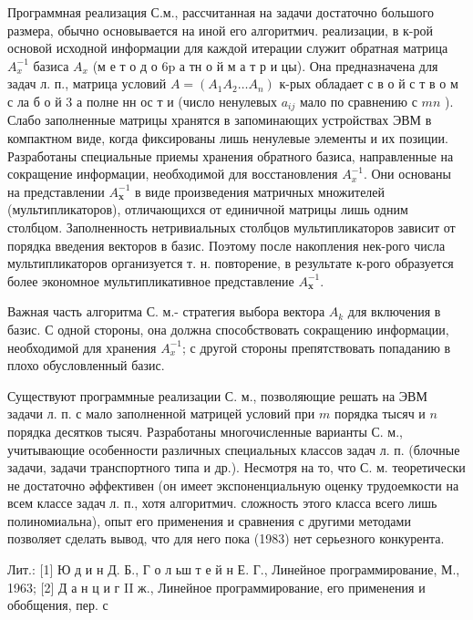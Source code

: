 \documentclass[10pt]{article}
\begin{document}
Программная реализация С.м., рассчитанная на задачи достаточно большого размера, обычно основывается на иной его алгоритмич. реализации, в к-рой основой исходной информации для каждой итерации служит обратная матрица $A_{x}^{-1}$ базиса $A_{x}$ (м е т о д о $6 \mathrm{p}$ а тн о й м а т р и цы). Она предназначена для задач л. п., матрица условий $A=\left(A_{1} A_{2} \ldots A_{n}\right)$ к-рых обладает с в о й с т в о м с ла б о й 3 а полне нн ос т и (число ненулевых $a_{i j}$ мало по сравнению с $m n$ ). Слабо заполненные матрицы хранятся в запоминающих устройствах ЭВМ в компактном виде, когда фиксированы лишь ненулевые элементы и их позиции. Разработаны специальные приемы хранения обратного базиса, направленные на сокращение информации, необходимой для восстановления $A_{x}^{-1}$. Они основаны на представлении $A_{\boldsymbol{x}}^{-1}$ в виде произведения матричных множителей (мультипликаторов), отличающихся от единичной матрицы лишь одним столбцом. Заполненность нетривиальных столбцов мультипликаторов зависит от порядка введения векторов в базис. Поэтому после накопления нек-рого числа мультипликаторов организуется т. н. повторение, в результате к-рого образуется более экономное мультипликативное представление $A_{\boldsymbol{x}}^{-1}$.



Важная часть алгоритма С. м.- стратегия выбора вектора $A_{k}$ для включения в базис. С одной стороны, она должна способствовать сокращению информации, необходимой для хранения $A_{x}^{-1}$; с другой стороны препятствовать попаданию в плохо обусловленный базис.



Существуют программные реализации С. м., позволяющие решать на ЭВМ задачи л. п. с мало заполненной матрицей условий при $m$ порядка тысяч и $n$ порядка десятков тысяч. Разработаны многочисленные варианты С. м., учитывающие особенности различных специальных классов задач л. п. (блочные задачи, задачи транспортного типа и др.). Несмотря на то, что С. м. теоретически не достаточно әффективен (он имеет экспоненциальную оценку трудоемкости на всем классе задач л. п., хотя алгоритмич. сложность этого класса всего лишь полиномиальна), опыт его применения и сравнения с другими методами позволяет сделать вывод, что для него пока (1983) нет серьезного конкурента.



Лит.: [1] Ю д и н Д. Б., Г о л ьш т е й н Е. Г., Линейное программирование, М., 1963; [2] Д а н ц и г II ж., Линейное программирование, его применения и обобщения, пер. с
\end{document}
